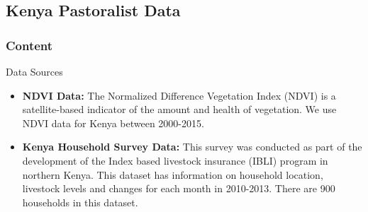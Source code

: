 \documentclass{beamer}
\begin{document}
    



\subsection{Kenya Pastoralist Data}
\begin{frame}
    \frametitle{Content}
\end{frame}

\begin{frame}{Data Sources}
\begin{itemize}
    \setlength\itemsep{2em}
    \item \textbf{NDVI Data:} The Normalized Difference Vegetation Index (NDVI) is a satellite-based indicator of the amount and health of vegetation. We use NDVI data for Kenya between 2000-2015. %
    \item \textbf{Kenya Household Survey Data:} This survey was conducted as part of the development of the Index based livestock insurance (IBLI) program in northern Kenya.  This dataset has information on household location, livestock levels and changes for each month in 2010-2013. There are 900 households in this dataset. 
\end{itemize}
\end{frame}
\end{document}
